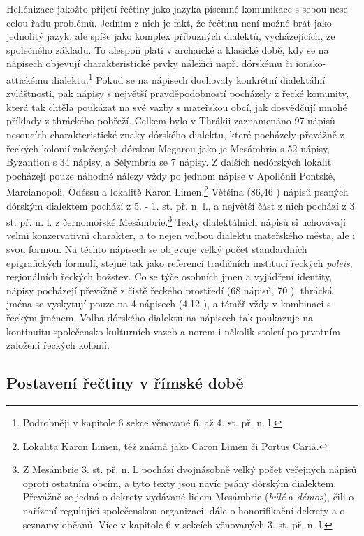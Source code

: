 Hellénizace jakožto přijetí řečtiny jako jazyka písemné komunikace s sebou nese celou řadu problémů. Jedním z nich je fakt, že řečtinu není možné brát jako jednolitý jazyk, ale spíše jako komplex příbuzných dialektů, vycházejících, ze společného základu. To alespoň platí v archaické a klasické době, kdy se na nápisech objevují charakteristické prvky náležící např. dórskému či ionsko-attickému dialektu.\footnote{Podrobněji v kapitole 6 sekce věnované 6. až 4. st. př. n. l.} Pokud se na nápisech dochovaly konkrétní dialektální zvláštnosti, pak nápisy s největší pravděpodobností pocházely z řecké komunity, která tak chtěla poukázat na své vazby s mateřskou obcí, jak dosvědčují mnohé příklady z thráckého pobřeží. Celkem bylo v Thrákii zaznamenáno 97 nápisů nesoucích charakteristické znaky dórského dialektu, které pocházely převážně z řeckých kolonií založených dórskou Megarou jako je Mesámbria s 52 nápisy, Byzantion s 34 nápisy, a Sélymbria se 7 nápisy. Z dalších nedórských lokalit pocházejí pouze náhodné nálezy vždy po jednom nápise v Apollónii Pontské, Marcianopoli, Odéssu a lokalitě Karon Limen.\footnote{Lokalita Karon Limen, též známá jako Caron Limen či Portus Caria.} Většina (86,46 ) nápisů psaných dórským dialektem pochází z 5. - 1. st. př. n. l., a největší část z nich pochází z 3. st. př. n. l. z černomořské Mesámbrie.\footnote{Z Mesámbrie 3. st. př. n. l. pochází dvojnásobně velký počet veřejných nápisů oproti ostatním obcím, a tyto texty jsou navíc psány dórským dialektem. Převážně se jedná o dekrety vydávané lidem Mesámbrie ({\em búlé} a {\em démos}), čili o nařízení regulující společenskou organizaci, dále o honorifikační dekrety a o seznamy občanů. Více v kapitole 6 v sekcích věnovaných 3. st. př. n. l.} Texty dialektálních nápisů si uchovávají velmi konzervativní charakter, a to nejen volbou dialektu mateřského města, ale i svou formou. Na těchto nápisech se objevuje velký počet standardních epigrafických formulí, stejně tak jako referencí tradičních institucí řeckých {\em poleis}, regionálních řeckých božstev. Co se týče osobních jmen a vyjádření identity, nápisy pocházejí převážně z čistě řeckého prostředí (68 nápisů, 70 ), thrácká jména se vyskytují pouze na 4 nápisech (4,12 ), a téměř vždy v kombinaci s řeckým jménem. Volba dórského dialektu na nápisech tak poukazuje na kontinuitu společensko-kulturních vazeb a norem i několik století po prvotním založení řeckých kolonií.

\subsection[postavení-řečtiny-v-římské-době]{Postavení řečtiny v římské době}

